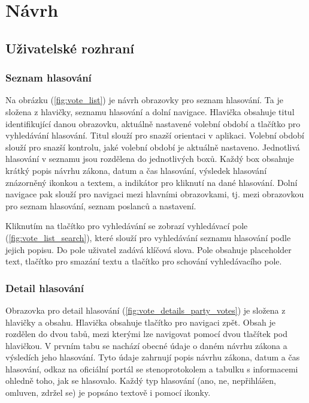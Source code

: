 \chapter{Návrh}

\setcounter{page}{1}

\section{Uživatelské rozhraní}

\subsection*{Seznam hlasování}

Na obrázku (\ref{fig:vote_list}) je návrh obrazovky pro seznam hlasování. Ta je složena z hlavičky, seznamu hlasování a dolní navigace. Hlavička obsahuje titul identifikující danou obrazovku,  aktuálně nastavené volební období a tlačítko pro vyhledávání hlasování. Titul slouží pro snazší orientaci v aplikaci. Volební období slouží pro snazší kontrolu, jaké volební období je aktuálně nastaveno. Jednotlivá hlasování v seznamu jsou rozdělena do jednotlivých boxů. Každý box obsahuje krátký popis návrhu zákona, datum a čas hlasování, výsledek hlasování znázorněný ikonkou a textem, a indikátor pro kliknutí na dané hlasování. Dolní navigace pak slouží pro navigaci mezi hlavními obrazovkami, tj. mezi obrazovkou pro seznam hlasování, seznam poslanců a nastavení.

Kliknutím na tlačítko pro vyhledávání se zobrazí vyhledávací pole (\ref{fig:vote_list_search}), které slouží pro vyhledávání seznamu hlasování podle jejich popisu. Do pole uživatel zadává klíčová slova. Pole obsahuje placeholder text, tlačítko pro smazání textu a tlačítko pro schování vyhledávacího pole.%

\subsection*{Detail hlasování}

Obrazovka pro detail hlasování (\ref{fig:vote_details_party_votes}) je složena z hlavičky a obsahu. Hlavička obsahuje tlačítko pro navigaci zpět. Obsah je rozdělen do dvou tabů, mezi kterými lze navigovat pomocí dvou tlačítek pod hlavičkou. V prvním tabu se nachází obecné údaje o daném návrhu zákona a výsledích jeho hlasování. Tyto údaje zahrnují popis návrhu zákona, datum a čas hlasování, odkaz na oficiální portál se stenoprotokolem a tabulku s informacemi ohledně toho, jak se hlasovalo. Každý typ hlasování (ano, ne, nepřihlášen, omluven, zdržel se) je popsáno textově i pomocí ikonky.

